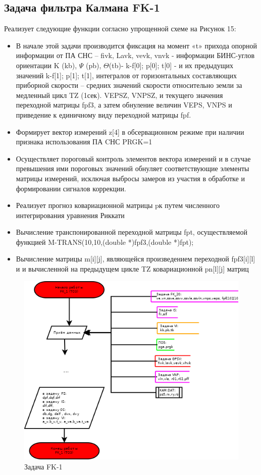 \subsection{Задача фильтра Калмана FK-1}
Реализует следующие функции согласно упрощенной схеме на Рисунок 15:
\begin{itemize}
    \item В начале этой задачи производится фиксация на момент  «t»   прихода опорной информации от  ПА СНС – fivk, Lavk, vevk, vnvk -  
    информации БИНС-углов ориентации K  (kb),  $\Psi$ (pb), $\Theta$(tb)- k-f[0];  p[0];  t[0] -  и их  предыдущих  значений   k-f[1];  p[1];  t[1],  
    интегралов от горизонтальных составляющих приборной скорости – средних значений скорости относительно земли  за медленный цикл  TZ  (1сек). 
    VEPSZ, VNPSZ,  и текущего значения переходной матрицы   fpf3, а затем обнуление величин VEPS, VNPS и приведение к единичному виду переходной 
    матрицы  fpf.
    \item Формирует  вектор  измерений z[4] в обсервационном режиме при наличии признака  использования ПА CНС  PRGK=1
    \item Осуществляет пороговый контроль элементов вектора измерений  и в случае превышения  ими  пороговых значений  обнуляет соответствующие 
    элементы матрицы измерений,  исключая  выбросы замеров  из участия в обработке и формировании сигналов коррекции.
    \item Реализует  прогноз ковариационной матрицы pк путем численного интегрирования  уравнения Риккати 
    \item Вычисление  транспонированной переходной матрицы fpt, осуществляемой   функцией   M-TRANS(10,10,(double *)fpf3,(double *)fpt);  
    \item Вычисление  матрицы  m[i][j],  являющейся произведением  переходной fpf3[i][l] и и вычисленной  на предыдущем  цикле TZ  
    ковариационной pn[l][j] матриц
\end{itemize}
\begin{figure}[H]
    \centering
    \includegraphics[width=0.75\linewidth]{images/FK_1_simple.png}
    \caption{Задача FK-1}
    \label{fig:FK-1}
\end{figure}
